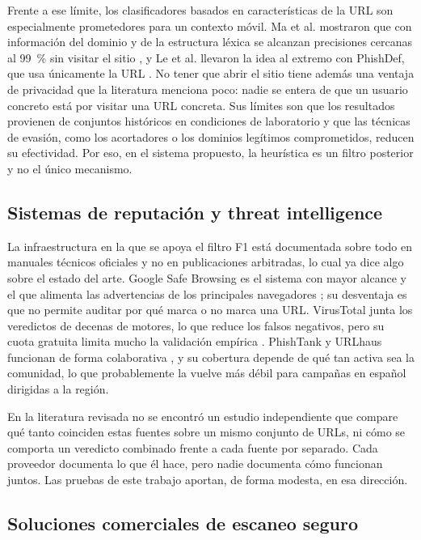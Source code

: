 Frente a ese límite, los clasificadores basados en características de la URL son especialmente prometedores para un contexto móvil. Ma et al. mostraron que con información del dominio y de la estructura léxica se alcanzan precisiones cercanas al 99~\% sin visitar el sitio \cite{ma2009beyond}, y Le et al. llevaron la idea al extremo con PhishDef, que usa únicamente la URL \cite{le2011phishdef}. No tener que abrir el sitio tiene además una ventaja de privacidad que la literatura menciona poco: nadie se entera de que un usuario concreto está por visitar una URL concreta. Sus límites son que los resultados provienen de conjuntos históricos en condiciones de laboratorio y que las técnicas de evasión, como los acortadores o los dominios legítimos comprometidos, reducen su efectividad. Por eso, en el sistema propuesto, la heurística es un filtro posterior y no el único mecanismo.

\subsection{Sistemas de reputación y threat intelligence}

La infraestructura en la que se apoya el filtro F1 está documentada sobre todo en manuales técnicos oficiales y no en publicaciones arbitradas, lo cual ya dice algo sobre el estado del arte. Google Safe Browsing es el sistema con mayor alcance y el que alimenta las advertencias de los principales navegadores \cite{google_safebrowsing}; su desventaja es que no permite auditar por qué marca o no marca una URL. VirusTotal junta los veredictos de decenas de motores, lo que reduce los falsos negativos, pero su cuota gratuita limita mucho la validación empírica \cite{virustotal_apiv3}. PhishTank y URLhaus funcionan de forma colaborativa \cite{phishtank_devinfo,urlhaus_api}, y su cobertura depende de qué tan activa sea la comunidad, lo que probablemente la vuelve más débil para campañas en español dirigidas a la región.

En la literatura revisada no se encontró un estudio independiente que compare qué tanto coinciden estas fuentes sobre un mismo conjunto de URLs, ni cómo se comporta un veredicto combinado frente a cada fuente por separado. Cada proveedor documenta lo que él hace, pero nadie documenta cómo funcionan juntos. Las pruebas de este trabajo aportan, de forma modesta, en esa dirección.

\subsection{Soluciones comerciales de escaneo seguro}

